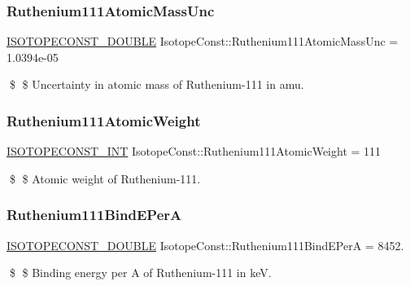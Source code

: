 \subsubsection{\texorpdfstring{Ruthenium111\+Atomic\+Mass\+Unc}{Ruthenium111AtomicMassUnc}}
{\footnotesize\ttfamily \mbox{\hyperlink{group___isotope_const-_macros_ga8f45a7272ce02c0b4c65c44636ed719a}{I\+S\+O\+T\+O\+P\+E\+C\+O\+N\+S\+T\+\_\+\+D\+O\+U\+B\+LE}} Isotope\+Const\+::\+Ruthenium111\+Atomic\+Mass\+Unc = 1.\+0394e-\/05}

\$ \$ Uncertainty in atomic mass of Ruthenium-\/111 in amu. \mbox{\label{group___isotope_const-_ruthenium-_ru111_gaa90fe84c2cbc0131b5515c0aa9e7cbe0}} 
\subsubsection{\texorpdfstring{Ruthenium111\+Atomic\+Weight}{Ruthenium111AtomicWeight}}
{\footnotesize\ttfamily \mbox{\hyperlink{group___isotope_const-_macros_ga5f18360b3e99483a35c32d789e62621c}{I\+S\+O\+T\+O\+P\+E\+C\+O\+N\+S\+T\+\_\+\+I\+NT}} Isotope\+Const\+::\+Ruthenium111\+Atomic\+Weight = 111}

\$ \$ Atomic weight of Ruthenium-\/111. \mbox{\label{group___isotope_const-_ruthenium-_ru111_gab4525b0b8b3e9461672bb9f89eefd3e0}} 
\subsubsection{\texorpdfstring{Ruthenium111\+Bind\+E\+PerA}{Ruthenium111BindEPerA}}
{\footnotesize\ttfamily \mbox{\hyperlink{group___isotope_const-_macros_ga8f45a7272ce02c0b4c65c44636ed719a}{I\+S\+O\+T\+O\+P\+E\+C\+O\+N\+S\+T\+\_\+\+D\+O\+U\+B\+LE}} Isotope\+Const\+::\+Ruthenium111\+Bind\+E\+PerA = 8452.}

\$ \$ Binding energy per A of Ruthenium-\/111 in keV. \mbox{\label{group___isotope_const-_ruthenium-_ru111_ga7e580ff1b397600a0d8581cf21eb8750}} 
